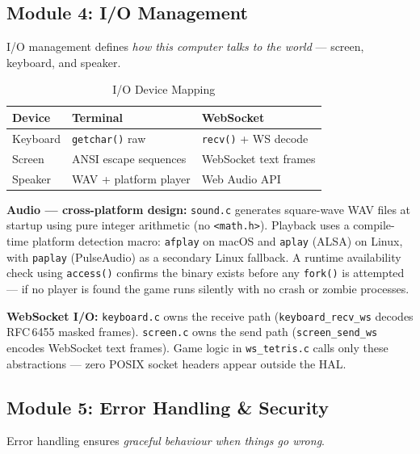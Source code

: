 \documentclass[conference]{IEEEtran}
\begin{document}
\subsection{Module 4: I/O Management}
I/O management defines \textit{how this computer talks to the world} --- screen, keyboard, and speaker.

\begin{table}[H]
\centering
\caption{I/O Device Mapping}
\begin{tabular}{lll}
\toprule
\textbf{Device} & \textbf{Terminal}         & \textbf{WebSocket}     \\
\midrule
Keyboard        & \texttt{getchar()} raw    & \texttt{recv()} + WS decode \\
Screen          & ANSI escape sequences     & WebSocket text frames  \\
Speaker         & WAV + platform player     & Web Audio API          \\
\bottomrule
\end{tabular}
\end{table}

\textbf{Audio --- cross-platform design:} \texttt{sound.c} generates square-wave WAV files at startup using pure integer arithmetic (no \texttt{<math.h>}). Playback uses a compile-time platform detection macro: \texttt{afplay} on macOS and \texttt{aplay} (ALSA) on Linux, with \texttt{paplay} (PulseAudio) as a secondary Linux fallback. A runtime availability check using \texttt{access()} confirms the binary exists before any \texttt{fork()} is attempted --- if no player is found the game runs silently with no crash or zombie processes.

\textbf{WebSocket I/O:} \texttt{keyboard.c} owns the receive path (\texttt{keyboard\_recv\_ws} decodes RFC\,6455 masked frames). \texttt{screen.c} owns the send path (\texttt{screen\_send\_ws} encodes WebSocket text frames). Game logic in \texttt{ws\_tetris.c} calls only these abstractions --- zero POSIX socket headers appear outside the HAL.

\subsection{Module 5: Error Handling \& Security}
Error handling ensures \textit{graceful behaviour when things go wrong}.
\end{document}
